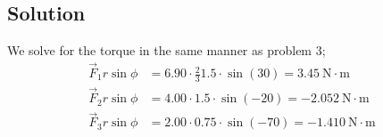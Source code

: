 \documentclass{article}
\begin{document}
\subsection*{Solution}
We solve for the torque in the same manner as problem 3;
\begin{align*}
	\vec{F}_1 r \sin \phi &= 6.90 \cdot \frac{2}{3}1.5 \cdot \sin(30) = \boxed{3.45\ \text{N}\cdot\text{m}} \\
	\vec{F}_2 r \sin \phi &= 4.00 \cdot 1.5 \cdot \sin(-20) = \boxed{-2.052\ \text{N}\cdot\text{m}} \\
	\vec{F}_3 r \sin \phi &= 2.00 \cdot 0.75 \cdot \sin(-70) = \boxed{-1.410\ \text{N}\cdot\text{m}} \\
\end{align*}
\end{document}
